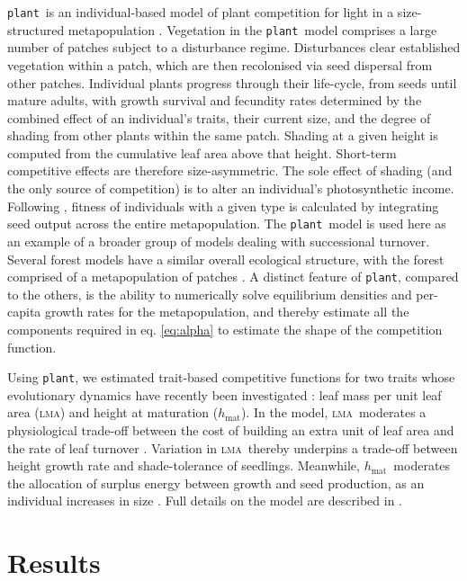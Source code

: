 \documentclass[a4paper,11pt]{article}
\newcommand{\plant}{{\tt plant}}
\newcommand{\hmat}{\ensuremath{h_{\text{mat}}}}
\newcommand{\lma}{\textsc{lma}}
\begin{document}
\plant\ is an individual-based model of plant competition for light in a size-structured metapopulation \citep{Falster-2016, Falster-2017}. Vegetation in the \plant\ model comprises a large number of patches subject to a disturbance regime. Disturbances clear established vegetation within a patch, which are then recolonised via seed dispersal from other patches. Individual plants progress through their life-cycle, from seeds until mature adults, with growth survival and fecundity rates determined by the combined effect of an individual's traits, their current size, and the degree of shading from other plants within the same patch. Shading at a given height is computed from the cumulative leaf area above that height. Short-term competitive effects are therefore size-asymmetric. The sole effect of shading (and the only source of competition) is to alter an individual's photosynthetic income. Following \citep{Falster-2017}, fitness of individuals with a given type is calculated by integrating seed output across the entire metapopulation. The \plant\ model is used here as an example of a broader group of models dealing with successional turnover. Several forest models have a similar overall ecological structure, with the forest comprised of a metapopulation of patches \citep{Huston-1987,Kohyama-1993,Moorcroft-2001, Medvigy-2012, Smith-2014}. A distinct feature of \plant, compared to the others, is the ability to numerically solve equilibrium densities and per-capita growth rates for the metapopulation, and thereby estimate all the components required in eq. \ref{eq:alpha} to estimate the shape of the competition function.

Using \plant, we estimated trait-based competitive functions for two traits whose evolutionary dynamics have recently been investigated \citep{Falster-2017}: leaf mass per unit leaf area (\lma) and height at maturation (\hmat). In the model, \lma\ moderates a physiological trade-off between the cost of building an extra unit of leaf area and the rate of leaf turnover \citep{Wright-2004}. Variation in \lma\ thereby underpins a trade-off between height growth rate and shade-tolerance of seedlings. Meanwhile, \hmat\ moderates the allocation of surplus energy between growth and seed production, as an individual increases in size \citep{Falster-2017}. Full details on the model are described in \citet{Falster-2016, Falster-2017}.

\section{Results}
\end{document}
